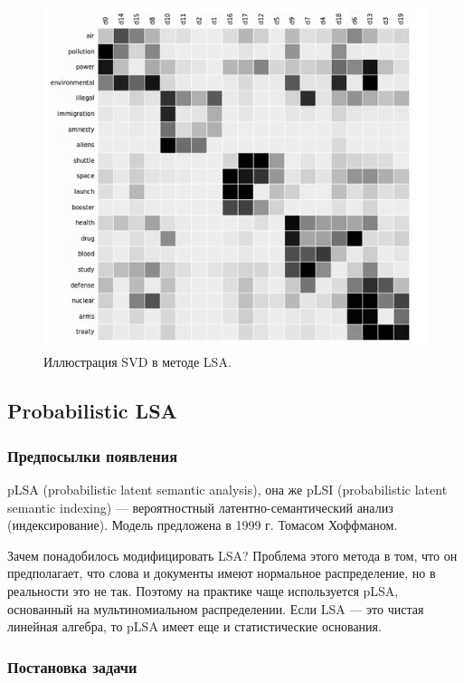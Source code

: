 \documentclass[10pt]{article}
\begin{document}
\begin{figure}[H]
	\begin{center}
		\includegraphics[scale = 0.5]{LSA2.png}
		\caption{Иллюстрация SVD в методе LSA.}
	\end{center}
\end{figure}

\subsection{Probabilistic LSA}

\subsubsection{Предпосылки появления}

pLSA (probabilistic latent semantic analysis), она же pLSI (probabilistic latent semantic indexing) --- вероятностный латентно-семантический анализ (индексирование). Модель предложена в 1999 г. Томасом Хоффманом.

Зачем понадобилось модифицировать LSA? Проблема этого метода в том, что он предполагает, что слова и документы имеют нормальное распределение, но в реальности это не так. Поэтому на практике чаще используется pLSA, основанный на мультиномиальном распределении. Если LSA — это чистая линейная алгебра, то pLSA имеет еще и статистические основания.

\subsubsection{Постановка задачи}
\end{document}
